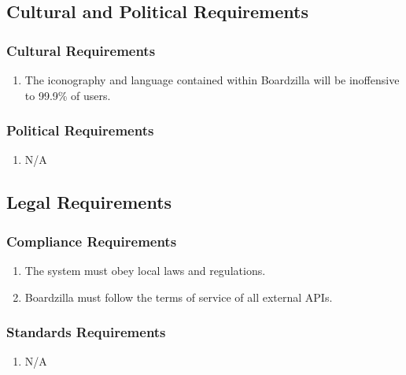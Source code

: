 \documentclass[]{article}
\begin{document}
	
	\subsection{Cultural and Political Requirements}
	\label{sub:cultural_and_political_requirements}
	
	\subsubsection{Cultural Requirements}
	\label{ssub:cultural_requirements}
	\begin{enumerate}[{CP}1. ]
		\item The iconography and language contained within Boardzilla will be inoffensive to 99.9\% of users.
	\end{enumerate}
	
	\subsubsection{Political Requirements}
	\label{ssub:political_requirements}
	\begin{enumerate}[{CP}1. ]
		\item N/A
	\end{enumerate}
	
	
	\subsection{Legal Requirements}
	\label{sub:legal_requirements}
	
	\subsubsection{Compliance Requirements}
	\label{ssub:compliance_requirements}
	\begin{enumerate}[{LR}1. ]
		\item The system must obey local laws and regulations.
		\item Boardzilla must follow the terms of service of all external APIs.
	\end{enumerate}
	
	\subsubsection{Standards Requirements}
	\label{ssub:standards_requirements}
	\begin{enumerate}[{LR}1. ]
		\item N/A
	\end{enumerate}
	
\end{document}
